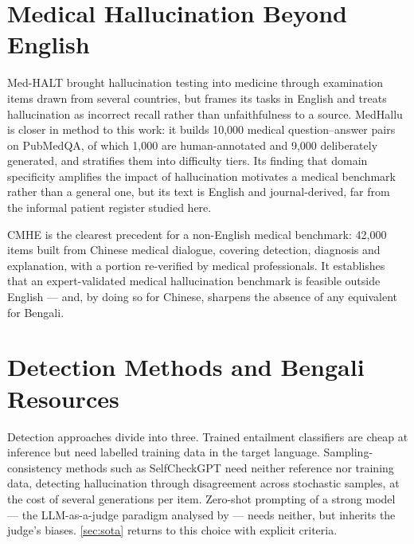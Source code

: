 \documentclass{iutbscthesis}
\begin{document}
\section{Medical Hallucination Beyond English}

Med-HALT \parencite{pal2023medhalt} brought hallucination testing into medicine through examination items drawn from several countries, but frames its tasks in English and treats hallucination as incorrect recall rather than unfaithfulness to a source. MedHallu \parencite{pandit2025medhallu} is closer in method to this work: it builds 10,000 medical question--answer pairs on PubMedQA, of which 1,000 are human-annotated and 9,000 deliberately generated, and stratifies them into difficulty tiers. Its finding that domain specificity amplifies the impact of hallucination motivates a medical benchmark rather than a general one, but its text is English and journal-derived, far from the informal patient register studied here.

CMHE \parencite{dou2024cmhe} is the clearest precedent for a non-English medical benchmark: 42,000 items built from Chinese medical dialogue, covering detection, diagnosis and explanation, with a portion re-verified by medical professionals. It establishes that an expert-validated medical hallucination benchmark is feasible outside English --- and, by doing so for Chinese, sharpens the absence of any equivalent for Bengali.

\section{Detection Methods and Bengali Resources}

Detection approaches divide into three. Trained entailment classifiers \parencite{kryscinski2020factcc} are cheap at inference but need labelled training data in the target language. Sampling-consistency methods such as SelfCheckGPT \parencite{manakul2023selfcheckgpt} need neither reference nor training data, detecting hallucination through disagreement across stochastic samples, at the cost of several generations per item. Zero-shot prompting of a strong model --- the LLM-as-a-judge paradigm analysed by \textcite{zheng2023judging} --- needs neither, but inherits the judge's biases. \autoref{sec:sota} returns to this choice with explicit criteria.
\end{document}
